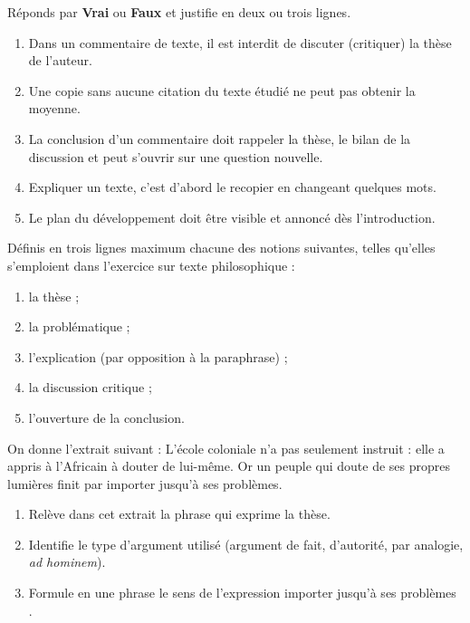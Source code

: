\documentclass[11pt]{article}
\newcommand{\cle}[1]{{\popxbold\color{popdark}#1}}
\begin{document}
\begin{exercice}
Réponds par \textbf{Vrai} ou \textbf{Faux} et justifie en deux ou trois lignes.
\begin{enumerate}
\item Dans un commentaire de texte, il est interdit de discuter (critiquer) la thèse de l'auteur.
\item Une copie sans aucune citation du texte étudié ne peut pas obtenir la moyenne.
\item La conclusion d'un commentaire doit rappeler la thèse, le bilan de la discussion et peut s'ouvrir sur une question nouvelle.
\item Expliquer un texte, c'est d'abord le recopier en changeant quelques mots.
\item Le plan du développement doit être visible et annoncé dès l'introduction.
\end{enumerate}
\end{exercice}

\begin{exercice}
Définis en trois lignes maximum chacune des notions suivantes, telles qu'elles s'emploient dans l'exercice sur texte philosophique :
\begin{enumerate}
\item la \cle{thèse} ;
\item la \cle{problématique} ;
\item l'\cle{explication} (par opposition à la paraphrase) ;
\item la \cle{discussion critique} ;
\item l'\cle{ouverture} de la conclusion.
\end{enumerate}
\end{exercice}

\begin{exercice}
On donne l'extrait suivant : \og L'école coloniale n'a pas seulement instruit : elle a appris à l'Africain à douter de lui-même. Or un peuple qui doute de ses propres lumières finit par importer jusqu'à ses problèmes. \fg
\begin{enumerate}
\item Relève dans cet extrait la phrase qui exprime la thèse.
\item Identifie le type d'argument utilisé (argument de fait, d'autorité, par analogie, \emph{ad hominem}).
\item Formule en une phrase le sens de l'expression \og importer jusqu'à ses problèmes \fg.
\end{enumerate}
\end{exercice}
\end{document}
